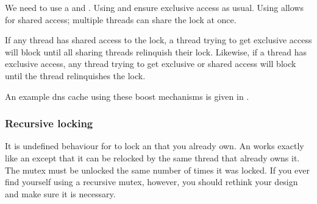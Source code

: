 We need to use a  and . Using  and  ensure exclusive access as usual. Using  allows for shared access; multiple threads can share the lock at once. 

If any thread has shared access to the lock, a thread trying to get exclusive access will block until all sharing threads relinquish their lock. Likewise, if a thread has exclusive access, any thread trying to get exclusive or shared access will block until the thread relinquishes the lock.

An example dns cache using these boost mechanisms is given in .


\subsubsection{Recursive locking}
It is undefined behaviour for to lock an  that you already own. An  works exactly like an  except that it can be relocked by the same thread that already owns it. The mutex must be unlocked the same number of times it was locked. If you ever find yourself using a recursive mutex, however, you should rethink your design and make sure it is necessary.